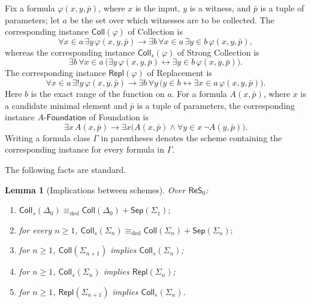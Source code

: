 \documentclass[11pt,a4paper]{article}
\newcommand{\ReSzero}{\mathsf{ReS}_{0}}
\newcommand{\Coll}[1]{\mathsf{Coll}(#1)}
\newcommand{\SColl}[1]{\mathsf{Coll}_{s}(#1)}
\newcommand{\Sep}[1]{\mathsf{Sep}(#1)}
\newcommand{\Repl}[1]{\mathsf{Repl}(#1)}
\newcommand{\Fnd}[1]{#1\text{-}\mathsf{Foundation}}
\newcommand{\Dedeq}{\mathrel{\equiv_{\mathrm{ded}}}}
\theoremstyle{plain}
\newtheorem{lemma}[theorem]{Lemma}
\theoremstyle{definition}
\theoremstyle{remark}
\begin{document}
Fix a formula \(\varphi(x,y,\bar p)\), where \(x\) is the input, \(y\) is a witness, and \(\bar p\) is a tuple of parameters; let \(a\) be the set over which witnesses are to be collected. The corresponding instance \(\Coll{\varphi}\) of Collection is
\begin{equation}
  \forall x\in a\,\exists y\,\varphi(x,y,\bar p)\longrightarrow
  \exists b\,\forall x\in a\,\exists y\in b\,\varphi(x,y,\bar p),
\label{eq:ordinary-collection}
\end{equation}
whereas the corresponding instance \(\SColl{\varphi}\) of Strong Collection is
\begin{equation}
  \exists b\,\forall x\in a\,
  \bigl(\exists y\,\varphi(x,y,\bar p)\longleftrightarrow
  \exists y\in b\,\varphi(x,y,\bar p)\bigr).
\label{eq:strong-collection}
\end{equation}
The corresponding instance \(\Repl{\varphi}\) of Replacement is
\begin{equation}
  \forall x\in a\,\exists! y\,\varphi(x,y,\bar p)\longrightarrow
  \exists b\,\forall y\,
  \bigl(y\in b\longleftrightarrow\exists x\in a\,\varphi(x,y,\bar p)\bigr).
\end{equation}
Here \(b\) is the exact range of the function on \(a\). For a formula \(A(x,\bar p)\), where \(x\) is a candidate minimal element and \(\bar p\) is a tuple of parameters, the corresponding instance \(\Fnd{A}\) of Foundation is
\begin{equation}
  \exists x\,A(x,\bar p)\longrightarrow
  \exists x\bigl(A(x,\bar p)\wedge\forall y\in x\,\neg A(y,\bar p)\bigr).
\label{eq:foundation}
\end{equation}
Writing a formula class \(\Gamma\) in parentheses denotes the scheme containing the corresponding instance for every formula in \(\Gamma\).

The following facts are standard.
\begin{lemma}[Implications between schemes]
\label{lem:scheme-implications}
Over \(\ReSzero\):
\begin{enumerate}[label=\textup{(\roman*)}]
\item \(\SColl{\Delta_0}\Dedeq\Coll{\Delta_0}+\Sep{\Sigma_1};\)
\item for every \(n\geq1\), \(\SColl{\Sigma_n}\Dedeq\Coll{\Sigma_n}+\Sep{\Sigma_n};\)
\item for \(n\geq1\), \(\Coll{\Sigma_{n+1}}\) implies \(\SColl{\Sigma_n}\);
\item for \(n\geq1\), \(\SColl{\Sigma_n}\) implies \(\Repl{\Sigma_n}\);
\item for \(n\geq1\), \(\Repl{\Sigma_{n+1}}\) implies \(\SColl{\Sigma_n}\).
\end{enumerate}
\end{lemma}
\end{document}
